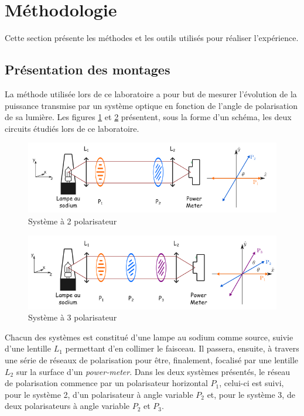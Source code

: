 \documentclass[11pt,letterpaper]{article}
\begin{document}

\section{Méthodologie}
Cette section présente les méthodes et les outils utilisés pour réaliser l'expérience.

\subsection{Présentation des montages}

La méthode utilisée lors de ce laboratoire a pour but de mesurer l'évolution de la puissance transmise par un système optique en fonction de l'angle de polarisation de sa lumière. Les figures \ref{systeme a 2 polarisateur} et \ref{systeme a 3 polarisateur} présentent, sous la forme d'un schéma, les deux circuits étudiés lors de ce laboratoire.

\begin{figure}[H]
  \centering
        \includegraphics[scale=0.71]{Systeme2polarisateurs.png}
        \caption{Système à 2 polarisateur}
        \label{systeme a 2 polarisateur}
\end{figure}

\begin{figure}[H]
  \centering
        \includegraphics[scale=0.71]{Systeme3polarisateurs.png}
        \caption{Système à 3 polarisateur}
        \label{systeme a 3 polarisateur}
\end{figure}

Chacun des systèmes est constitué d'une lampe au sodium comme source, suivie d'une lentille $L_1$ permettant d'en collimer le faisceau. Il passera, ensuite, à travers une série de réseaux de polarisation pour être, finalement, focalisé par une lentille $L_2$ sur la surface d'un \textit{power-meter}. Dans les deux systèmes présentés, le réseau de polarisation commence par un polarisateur horizontal $P_1$, celui-ci est suivi, pour le système 2, d'un polarisateur à angle variable $P_2$  et, pour le système 3, de deux polarisateurs à angle variable $P_2$ et $P_3$.
\end{document}
